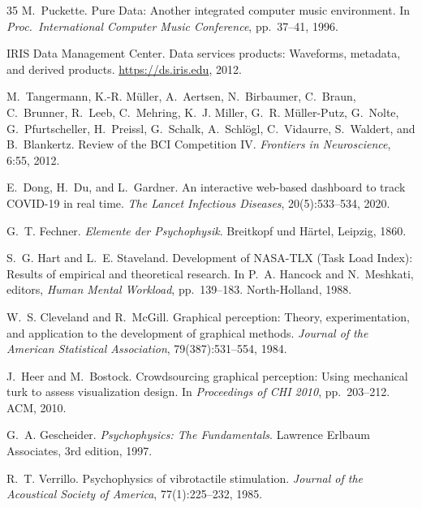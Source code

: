 \documentclass[sigchi, nonacm]{acmart}
\begin{document}
\begin{thebibliography}{35}
M.~Puckette.
\newblock Pure Data: Another integrated computer music environment.
\newblock In \emph{Proc.\ International Computer Music Conference}, pp.~37--41, 1996.

{IRIS Data Management Center}.
\newblock Data services products: Waveforms, metadata, and derived products.
\newblock \url{https://ds.iris.edu}, 2012.

M.~Tangermann, K.-R. M{\"u}ller, A.~Aertsen, N.~Birbaumer, C.~Braun, C.~Brunner, R.~Leeb, C.~Mehring, K.~J. Miller, G.~R. M{\"u}ller-Putz, G.~Nolte, G.~Pfurtscheller, H.~Preissl, G.~Schalk, A.~Schl{\"o}gl, C.~Vidaurre, S.~Waldert, and B.~Blankertz.
\newblock Review of the {BCI} Competition {IV}.
\newblock \emph{Frontiers in Neuroscience}, 6:55, 2012.

E.~Dong, H.~Du, and L.~Gardner.
\newblock An interactive web-based dashboard to track {COVID-19} in real time.
\newblock \emph{The Lancet Infectious Diseases}, 20(5):533--534, 2020.

G.~T. Fechner.
\newblock \emph{Elemente der Psychophysik}.
\newblock Breitkopf und H{\"a}rtel, Leipzig, 1860.

S.~G. Hart and L.~E. Staveland.
\newblock Development of {NASA-TLX} (Task Load Index): Results of empirical and theoretical research.
\newblock In P.~A. Hancock and N.~Meshkati, editors, \emph{Human Mental Workload}, pp.~139--183. North-Holland, 1988.

W.~S. Cleveland and R.~McGill.
\newblock Graphical perception: Theory, experimentation, and application to the development of graphical methods.
\newblock \emph{Journal of the American Statistical Association}, 79(387):531--554, 1984.

J.~Heer and M.~Bostock.
\newblock Crowdsourcing graphical perception: Using mechanical turk to assess visualization design.
\newblock In \emph{Proceedings of CHI 2010}, pp.~203--212. ACM, 2010.

G.~A. Gescheider.
\newblock \emph{Psychophysics: The Fundamentals}.
\newblock Lawrence Erlbaum Associates, 3rd edition, 1997.

R.~T. Verrillo.
\newblock Psychophysics of vibrotactile stimulation.
\newblock \emph{Journal of the Acoustical Society of America}, 77(1):225--232, 1985.


\end{thebibliography}
\end{document}
